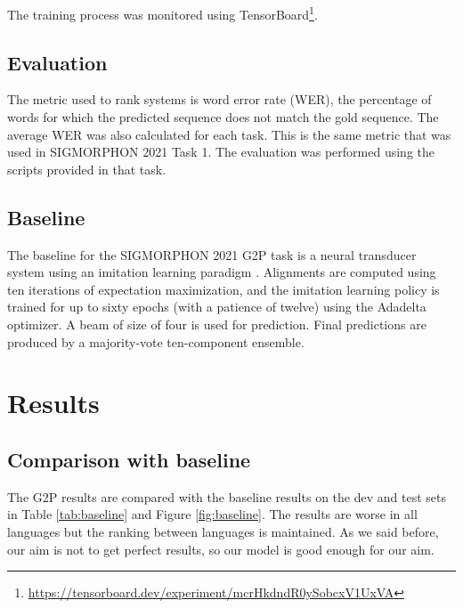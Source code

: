 \documentclass[11pt,a4paper]{article}
\begin{document}
The training process was monitored using TensorBoard\footnote{\url{https://tensorboard.dev/experiment/mcrHkdndR0ySobcxV1UxVA}}.

\subsection{Evaluation}

The metric used to rank systems is word error rate (WER), the percentage of words for which the predicted sequence does not match the gold sequence. The average WER was also calculated for each task. This is the same metric that was used in SIGMORPHON 2021 Task 1. The evaluation was performed using the scripts provided in that task.

\subsection{Baseline}

The baseline for the SIGMORPHON 2021 G2P task is a neural transducer system using an imitation learning paradigm \cite{makarov-clematide-2018-imitation}. Alignments are computed using ten iterations of expectation maximization, and the imitation learning policy is trained for up to sixty epochs (with a patience of twelve) using the Adadelta optimizer. A beam of size of four is used for prediction. Final predictions are produced by a majority-vote ten-component ensemble.

\section{Results}

\subsection{Comparison with baseline}

The G2P results are compared with the baseline results on the dev and test sets in Table \ref{tab:baseline} and Figure \ref{fig:baseline}. The results are worse in all languages but the ranking between languages is maintained. As we said before, our aim is not to get perfect results, so our model is good enough for our aim.
\end{document}
